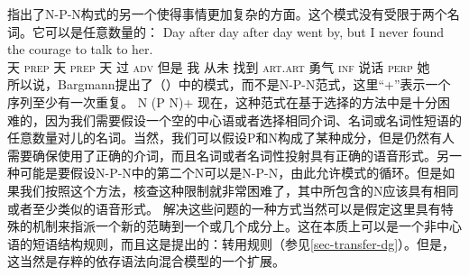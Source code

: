 %
 \citet{Bargmann2015a}指出了N-P-N构式的另一个使得事情更加复杂的方面。这个模式没有受限于两个名词。它可以是任意数量的：
\ea
\gll Day after day after day went by, but I never found the courage to talk to her.\\
天 \textsc{prep} 天 \textsc{prep} 天 过 \textsc{adv} 但是 我 从未 找到 \textsc{art}.\textsc{art} 勇气 \textsc{inf} 说话 \textsc{perp} 她\\
\z
所以说，Bargmann提出了（）中的模式，而不是N-P-N范式，这里“+”\isce{$+$}{$+$}表示一个序列至少有一次重复。
\ea
\label{n-p-n-plus-cx}
N (P N)+
\z
现在，这种范式在基于选择的方法中是十分困难的，因为我们需要假设一个空的中心语或者选择相同介词、名词或名词性短语的任意数量对儿的名词。当然，我们可以假设P和N构成了某种成分，但是仍然有人需要确保使用了正确的介词，而且名词或者名词性投射具有正确的语音形式。另一种可能是要假设N-P-N中的第二个N可以是N-P-N，由此允许模式的循环。但是如果我们按照这个方法，核查这种限制就非常困难了，其中所包含的N应该具有相同或者至少类似的语音形式。
%
解决这些问题的一种方式当然可以是假定这里具有特殊的机制来指派一个新的范畴到一个或几个成分上。这在本质上可以是一个非中心语的短语结构规则，而且这是\tes 提出的：转用规则（参见\ref{sec-transfer-dg}）。但是，这当然是存粹的依存语法向混合模型的一个扩展。
